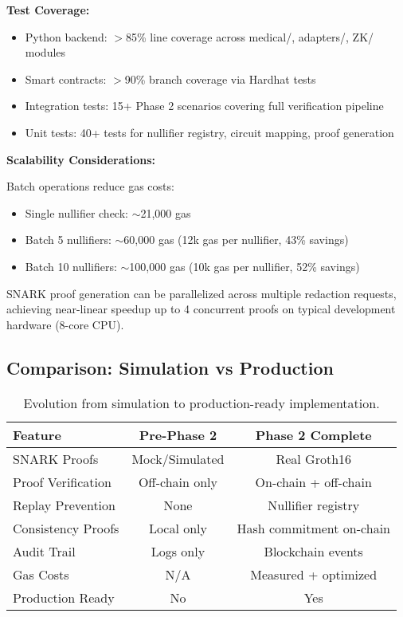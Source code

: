 \textbf{Test Coverage:}
\begin{itemize}
    \item Python backend: $>$85\% line coverage across medical/, adapters/, ZK/ modules
    \item Smart contracts: $>$90\% branch coverage via Hardhat tests
    \item Integration tests: 15+ Phase 2 scenarios covering full verification pipeline
    \item Unit tests: 40+ tests for nullifier registry, circuit mapping, proof generation
\end{itemize}

\textbf{Scalability Considerations:}

Batch operations reduce gas costs:
\begin{itemize}
    \item Single nullifier check: $\sim$21,000 gas
    \item Batch 5 nullifiers: $\sim$60,000 gas (12k gas per nullifier, 43\% savings)
    \item Batch 10 nullifiers: $\sim$100,000 gas (10k gas per nullifier, 52\% savings)
\end{itemize}

SNARK proof generation can be parallelized across multiple redaction requests, achieving near-linear speedup up to 4 concurrent proofs on typical development hardware (8-core CPU).

\subsection{Comparison: Simulation vs Production}

\begin{table}[h]
\centering
\begin{tabular}{lcc}
\toprule
\textbf{Feature} & \textbf{Pre-Phase 2} & \textbf{Phase 2 Complete} \\
\midrule
SNARK Proofs & Mock/Simulated & Real Groth16 \\
Proof Verification & Off-chain only & On-chain + off-chain \\
Replay Prevention & None & Nullifier registry \\
Consistency Proofs & Local only & Hash commitment on-chain \\
Audit Trail & Logs only & Blockchain events \\
Gas Costs & N/A & Measured + optimized \\
Production Ready & No & Yes \\
\bottomrule
\end{tabular}
\caption{Evolution from simulation to production-ready implementation.}
\label{tab:simulation_vs_production}
\end{table}


